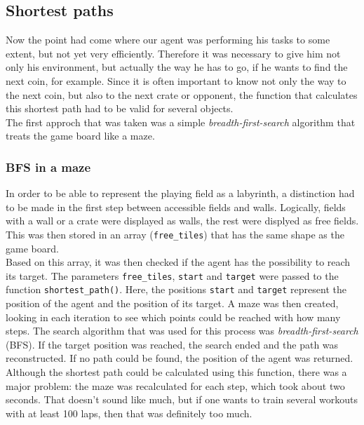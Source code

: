 \subsection{Shortest paths}
Now the point had come where our agent was performing his tasks to some extent, but not yet very efficiently. Therefore it was necessary to give him not only his environment, but actually the way he has to go, if he wants to find the next coin, for example. Since it is often important to know not only the way to the next coin, but also to the next crate or opponent, the function that calculates this shortest path had to be valid for several objects.
\\

The first approch that was taken was a simple \textsl{breadth-first-search} algorithm that treats the game board like a maze.

\subsubsection*{BFS in a maze}
In order to be able to represent the playing field as a labyrinth, a distinction had to be made in the first step between accessible fields and walls. Logically, fields with a wall or a crate were displayed as walls, the rest were displyed as free fields. This was then stored in an array (\texttt{free\_tiles}) that has the same shape as the game board. 
\\

Based on this array, it was then checked if the agent has the possibility to reach its target. The parameters \texttt{free\_tiles}, \texttt{start} and \texttt{target} were passed to the function \texttt{shortest\_path()}. Here, the positions \texttt{start} and \texttt{target} represent the position of the agent and the position of its target. A maze was then created, looking in each iteration to see which points could be reached with how many steps. The search algorithm that was used for this process was \textit{breadth-first-search} (BFS). If the target position was reached, the search ended and the path was reconstructed. If no path could be found, the position of the agent was returned. 
\\

Although the shortest path could be calculated using this function, there was a major problem: the maze was recalculated for each step, which took about two seconds. That doesn't sound like much, but if one wants to train several workouts with at least 100 laps, then that was definitely too much.

